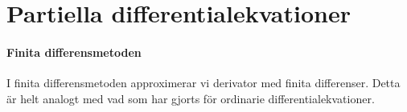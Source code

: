 \section{Partiella differentialekvationer}

\paragraph{Finita differensmetoden}
I finita differensmetoden approximerar vi derivator med finita differenser. Detta är helt analogt med vad som har gjorts för ordinarie differentialekvationer.